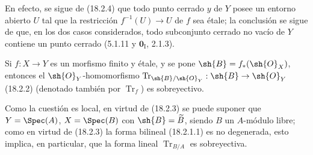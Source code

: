 En efecto, se sigue de (18.2.4) que todo punto cerrado $y$ de $Y$ posee un entorno abierto $U$ tal que la restricción $f^{-1}(U)\to U$ de $f$ sea étale; la conclusión se sigue de que, en los dos casos considerados, todo subconjunto cerrado no vacío de $Y$ contiene un punto cerrado (5.1.11 y $\mathbf 0_{\mathrm I}$, 2.1.3).

\begin{corollary}[18.2.6]
\label{IV.18.2.6}
Si $f:X\to Y$ es un morfismo finito y étale, y se pone $\sh{B}=f_*(\sh{O}_X)$, entonces el $\sh{O}_Y$-homomorfismo $\operatorname{Tr}_{\sh{B}/\sh{O}_Y}:\sh{B}\to\sh{O}_Y$ \textup{(18.2.2) (denotado también por $\operatorname{Tr}_f$)} es sobreyectivo.
\end{corollary}

Como la cuestión es local, en virtud de (18.2.3) se puede suponer que $Y=\Spec(A)$, $X=\Spec(B)$ con $\sh{B}=\widetilde B$, siendo $B$ un $A$-módulo libre; como en virtud de (18.2.3) la forma bilineal (18.2.1.1) es no degenerada, esto implica, en particular, que la forma lineal $\operatorname{Tr}_{B/A}$ es sobreyectiva.

